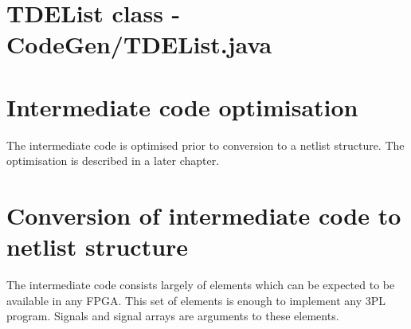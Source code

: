 \documentclass[10pt,a4paper,twoside,fleqn]{book}
\begin{document}
        
        

    \section{TDEList class - CodeGen/TDEList.java}

        



    \section{Intermediate code optimisation}
    
        The intermediate code is optimised prior to conversion to
        a netlist structure. The optimisation is described in a later chapter.

    \section{Conversion of intermediate code to netlist structure}

        The intermediate code consists largely of elements which can be
        expected to be available in any FPGA. This set of elements is enough
        to implement any 3PL program. Signals and signal arrays are arguments
        to these elements.
\end{document}
